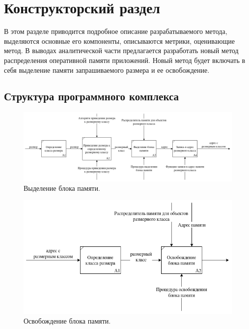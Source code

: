 \chapter{Конструкторский раздел}
В этом разделе приводится подробное описание разрабатываемого метода, выделяются основные его компоненты, описываются метрики, оценивающие метод. В выводах аналитической части предлагается разработать новый метод распределения оперативной памяти приложений. Новый метод будет включать в себя выделение памяти запрашиваемого размера и ее освобождение.

\section{Структура программного комплекса}
\begin{figure}[!h]
	\begin{center}
		\includegraphics[scale=0.4]{images/block-allocation.png}
		\caption{Выделение блока памяти.}
		\label{block-allocation}
	\end{center}
\end{figure}

\begin{figure}[!h]
	\begin{center}
		\includegraphics[scale=0.4]{images/block-free.png}
		\caption{Освобождение блока памяти.}
		\label{block-free}
	\end{center}
\end{figure}

